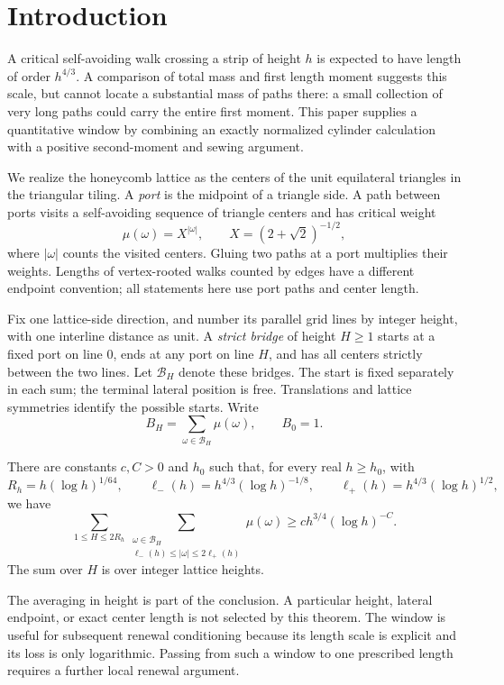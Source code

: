 \section{Introduction}
A critical self-avoiding walk crossing a strip of height $h$ is expected
to have length of order $h^{4/3}$. A comparison of total mass and first
length moment suggests this scale, but cannot locate a substantial mass
of paths there: a small collection of very long paths could carry the
entire first moment. This paper supplies a quantitative window by combining
an exactly normalized cylinder calculation with a positive second-moment
and sewing argument.

We realize the honeycomb lattice as the centers of the unit equilateral
triangles in the triangular tiling. A \emph{port} is the midpoint of a
triangle side. A path between ports visits a self-avoiding sequence of
triangle centers and has critical weight
\[
 \mu(\omega)=X^{|\omega|},\qquad X=(2+\sqrt2)^{-1/2},
\]
where $|\omega|$ counts the visited centers. Gluing two paths at a port
multiplies their weights. Lengths of vertex-rooted walks counted by edges
have a different endpoint convention; all statements here use port paths
and center length.

Fix one lattice-side direction, and number its parallel grid lines by
integer height, with one interline distance as unit. A \emph{strict bridge}
of height $H\ge1$ starts at a fixed port on line $0$, ends at any port on
line $H$, and has all centers strictly between the two lines. Let
$\mathcal B_H$ denote these bridges. The start is fixed separately in
each sum; the terminal lateral position is free. Translations and lattice
symmetries identify the possible starts. Write
\[
 B_H=\sum_{\omega\in\mathcal B_H}\mu(\omega),\qquad B_0=1.
\]

\begin{theorem}\label{L:thm:window}
There are constants $c,C>0$ and $h_0$ such that, for every real
$h\ge h_0$, with
\[
 R_h=h(\log h)^{1/64},\qquad
 \ell_-(h)=h^{4/3}(\log h)^{-1/8},\qquad
 \ell_+(h)=h^{4/3}(\log h)^{1/2},
\]
we have
\[
 \sum_{1\le H\le 2R_h}
 \sum_{\substack{\omega\in\mathcal B_H\\
       \ell_-(h)\le|\omega|\le2\ell_+(h)}}\mu(\omega)
 \ge c h^{3/4}(\log h)^{-C}.
\]
The sum over $H$ is over integer lattice heights.
\end{theorem}

The averaging in height is part of the conclusion. A particular height,
lateral endpoint, or exact center length is not selected by this theorem.
The window is useful for subsequent renewal conditioning because its length
scale is explicit and its loss is only logarithmic. Passing from such a
window to one prescribed length requires a further local renewal argument.

